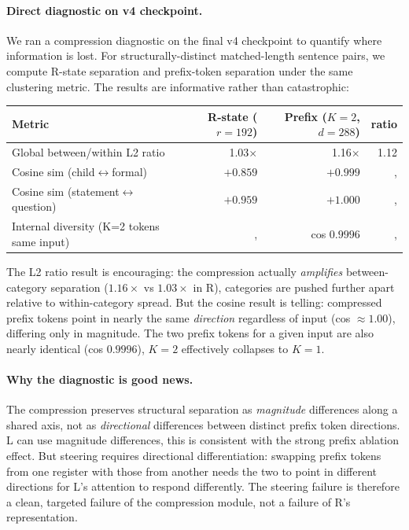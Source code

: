 \documentclass[11pt, a4paper]{article}
\theoremstyle{plain}
\theoremstyle{definition}
\theoremstyle{remark}
\begin{document}
\paragraph{Direct diagnostic on v4 checkpoint.}
We ran a compression diagnostic on the final v4 checkpoint to quantify where information is lost.
For structurally-distinct matched-length sentence pairs, we compute R-state separation and prefix-token separation under the same clustering metric.
The results are informative rather than catastrophic:

\begin{center}
\begin{tabular}{lrrr}
\toprule
Metric & R-state ($r{=}192$) & Prefix ($K{=}2$, $d{=}288$) & ratio \\
\midrule
Global between/within L2 ratio & 1.03$\times$ & 1.16$\times$ & 1.12 \\
Cosine sim (child$\leftrightarrow$formal) & $+0.859$ & $+0.999$ & ,  \\
Cosine sim (statement$\leftrightarrow$question) & $+0.959$ & $+1.000$ & ,  \\
Internal diversity (K=2 tokens same input) & ,  & cos $0.9996$ & ,  \\
\bottomrule
\end{tabular}
\end{center}

The L2 ratio result is encouraging: the compression actually \emph{amplifies} between-category separation ($1.16\times$ vs $1.03\times$ in R), categories are pushed further apart relative to within-category spread.
But the cosine result is telling: compressed prefix tokens point in nearly the same \emph{direction} regardless of input (cos $\approx 1.00$), differing only in magnitude.
The two prefix tokens for a given input are also nearly identical (cos $0.9996$), $K{=}2$ effectively collapses to $K{=}1$.

\paragraph{Why the diagnostic is good news.}
The compression preserves structural separation as \emph{magnitude} differences along a shared axis, not as \emph{directional} differences between distinct prefix token directions.
L can use magnitude differences, this is consistent with the strong prefix ablation effect.
But steering requires directional differentiation: swapping prefix tokens from one register with those from another needs the two to point in different directions for L's attention to respond differently.
The steering failure is therefore a clean, targeted failure of the compression module, not a failure of R's representation.
\end{document}
